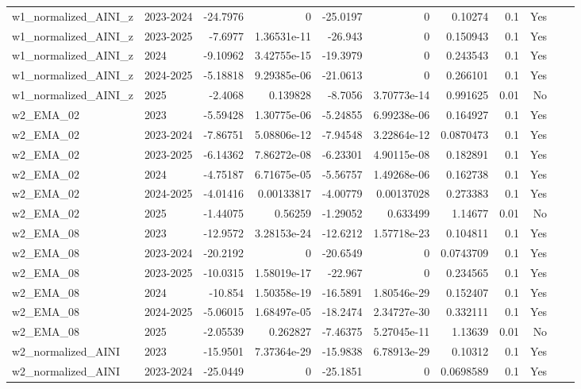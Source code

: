 \begin{longtable}{llrrrrrrrrl}
w1\_normalized\_AINI\_z & 2023-2024 & -24.7976 & 0 & -25.0197 & 0 & 0.10274 & 0.1 & Yes &  \\
w1\_normalized\_AINI\_z & 2023-2025 & -7.6977 & 1.36531e-11 & -26.943 & 0 & 0.150943 & 0.1 & Yes &  \\
w1\_normalized\_AINI\_z & 2024 & -9.10962 & 3.42755e-15 & -19.3979 & 0 & 0.243543 & 0.1 & Yes &  \\
w1\_normalized\_AINI\_z & 2024-2025 & -5.18818 & 9.29385e-06 & -21.0613 & 0 & 0.266101 & 0.1 & Yes &  \\
w1\_normalized\_AINI\_z & 2025 & -2.4068 & 0.139828 & -8.7056 & 3.70773e-14 & 0.991625 & 0.01 & No &  \\
w2\_EMA\_02 & 2023 & -5.59428 & 1.30775e-06 & -5.24855 & 6.99238e-06 & 0.164927 & 0.1 & Yes &  \\
w2\_EMA\_02 & 2023-2024 & -7.86751 & 5.08806e-12 & -7.94548 & 3.22864e-12 & 0.0870473 & 0.1 & Yes &  \\
w2\_EMA\_02 & 2023-2025 & -6.14362 & 7.86272e-08 & -6.23301 & 4.90115e-08 & 0.182891 & 0.1 & Yes &  \\
w2\_EMA\_02 & 2024 & -4.75187 & 6.71675e-05 & -5.56757 & 1.49268e-06 & 0.162738 & 0.1 & Yes &  \\
w2\_EMA\_02 & 2024-2025 & -4.01416 & 0.00133817 & -4.00779 & 0.00137028 & 0.273383 & 0.1 & Yes &  \\
w2\_EMA\_02 & 2025 & -1.44075 & 0.56259 & -1.29052 & 0.633499 & 1.14677 & 0.01 & No &  \\
w2\_EMA\_08 & 2023 & -12.9572 & 3.28153e-24 & -12.6212 & 1.57718e-23 & 0.104811 & 0.1 & Yes &  \\
w2\_EMA\_08 & 2023-2024 & -20.2192 & 0 & -20.6549 & 0 & 0.0743709 & 0.1 & Yes &  \\
w2\_EMA\_08 & 2023-2025 & -10.0315 & 1.58019e-17 & -22.967 & 0 & 0.234565 & 0.1 & Yes &  \\
w2\_EMA\_08 & 2024 & -10.854 & 1.50358e-19 & -16.5891 & 1.80546e-29 & 0.152407 & 0.1 & Yes &  \\
w2\_EMA\_08 & 2024-2025 & -5.06015 & 1.68497e-05 & -18.2474 & 2.34727e-30 & 0.332111 & 0.1 & Yes &  \\
w2\_EMA\_08 & 2025 & -2.05539 & 0.262827 & -7.46375 & 5.27045e-11 & 1.13639 & 0.01 & No &  \\
w2\_normalized\_AINI & 2023 & -15.9501 & 7.37364e-29 & -15.9838 & 6.78913e-29 & 0.10312 & 0.1 & Yes &  \\
w2\_normalized\_AINI & 2023-2024 & -25.0449 & 0 & -25.1851 & 0 & 0.0698589 & 0.1 & Yes &  \\

\end{longtable}
